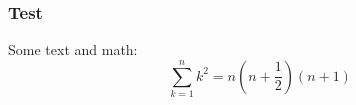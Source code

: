 \documentclass{beamer}
\begin{document}
\begin{frame}
\frametitle{Test}

Some text and math:
\[
\sum_{k=1}^n k^2=n\left(n+\frac{1}{2}\right)(n+1)
\]

\end{frame}
\end{document}
